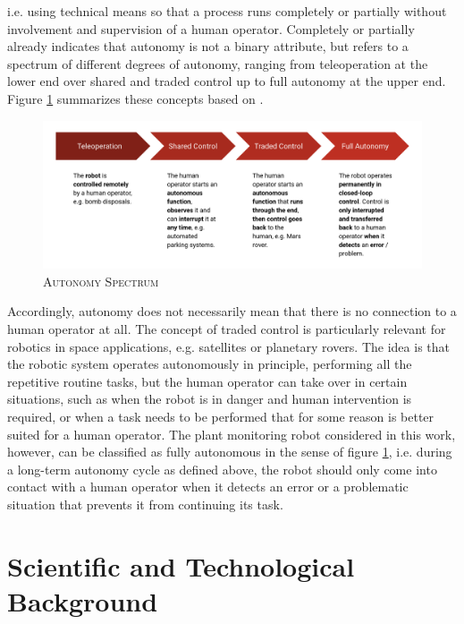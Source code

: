 \documentclass[english, master, utf8]{base/thesis_KBS}
\begin{document}
i.e. using technical means so that a process runs completely or partially without involvement and supervision of a human operator. \cite{Hertzberg:2015}
Completely or partially already indicates that autonomy is not a binary attribute, but refers to a spectrum of different degrees of autonomy,
ranging from teleoperation at the lower end over shared and traded control up to full autonomy at the upper end. \cite{Hertzberg:2015}
Figure \ref{fig:autonomy_spectrum} summarizes these concepts based on \cite{Hertzberg:2015}.
\begin{figure}[H]
    \centering
    \includegraphics[width=\textwidth]{pics/autonomy_spectrum.png}
    \caption{\textsc{Autonomy Spectrum}}
    \label{fig:autonomy_spectrum}
\end{figure}
Accordingly, autonomy does not necessarily mean that there is no connection to a human operator at all.
The concept of traded control is particularly relevant for robotics in space applications, e.g. satellites or planetary rovers.
The idea is that the robotic system operates autonomously in principle, performing all the repetitive routine tasks, but the human operator can take over in certain situations,
such as when the robot is in danger and human intervention is required, or when a task needs to be performed that for some reason is better suited for a human operator.
\cite{Kortenkamp:2009}
The plant monitoring robot considered in this work, however, can be classified as fully autonomous in the sense of figure \ref{fig:autonomy_spectrum}, 
i.e. during a long-term autonomy cycle as defined above, the robot should only come into contact with a human operator when it detects an error or a problematic situation
that prevents it from continuing its task.

\section{Scientific and Technological Background}
\label{sec:scientific_bg}
\end{document}
